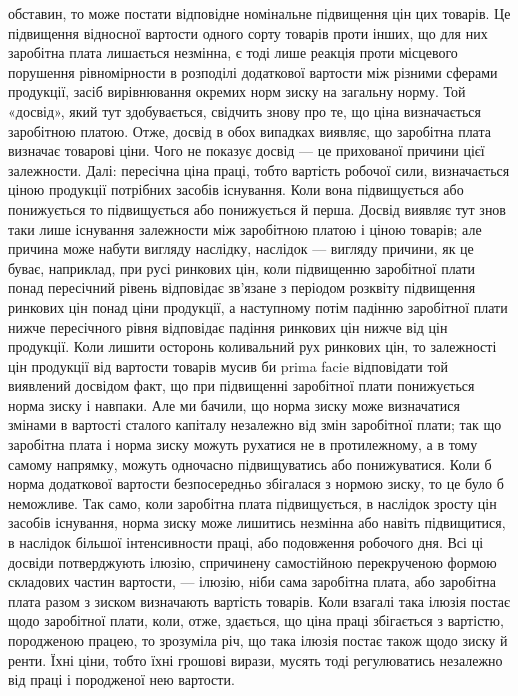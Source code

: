 \parcont{}  %
обставин, то може постати відповідне номінальне підвищення цін цих товарів. Це
підвищення відносної вартости одного сорту товарів проти інших, що для них
заробітна плата лишається незмінна, є тоді лише реакція проти місцевого порушення
рівномірности в розподілі додаткової вартости між різними сферами продукції,
засіб вирівнювання окремих норм зиску на загальну норму. Той «досвід», який
тут здобувається, свідчить знову про те, що ціна визначається заробітною платою.
Отже, досвід в обох випадках виявляє, що заробітна плата визначає товарові
ціни. Чого не показує досвід — це прихованої причини цієї залежности.
Далі: пересічна ціна праці, тобто вартість робочої сили, визначається ціною
продукції потрібних засобів існування. Коли вона підвищується або понижується
то підвищується або понижується й перша. Досвід виявляє тут знов таки лише
існування залежности між заробітною платою і ціною товарів; але причина
може набути вигляду наслідку, наслідок — вигляду причини, як це буває, наприклад,
при русі ринкових цін, коли підвищенню заробітної плати понад пересічний
рівень відповідає зв’язане з періодом розквіту підвищення ринкових цін
понад ціни продукції, а наступному потім падінню заробітної плати нижче пересічного
рівня відповідає падіння ринкових цін нижче від цін продукції. Коли
лишити осторонь коливальний рух ринкових цін, то залежності цін продукції
від вартости товарів мусив би prima facie відповідати той виявлений досвідом
факт, що при підвищенні заробітної плати понижується норма зиску і навпаки.
Але ми бачили, що норма зиску може визначатися змінами в вартості сталого
капіталу незалежно від змін заробітної плати; так що заробітна плата і
норма зиску можуть рухатися не в протилежному, а в тому самому напрямку,
можуть одночасно підвищуватись або понижуватися. Коли б норма додаткової
вартости безпосередньо збігалася з нормою зиску, то це було б неможливе.
Так само, коли заробітна плата підвищується, в наслідок зросту цін засобів
існування, норма зиску може лишитись незмінна або навіть підвищитися, в наслідок
більшої інтенсивности праці, або подовження робочого дня. Всі ці досвіди
потверджують ілюзію, спричинену самостійною перекрученою формою складових
частин вартости, — ілюзію, ніби сама заробітна плата, або заробітна плата разом
з зиском визначають вартість товарів. Коли взагалі така ілюзія постає
щодо заробітної плати, коли, отже, здається, що ціна праці збігається з вартістю,
породженою працею, то зрозуміла річ, що така ілюзія постає також щодо зиску
й ренти. Їхні ціни, тобто їхні грошові вирази, мусять тоді регулюватись
незалежно від праці і породженої нею вартости.


